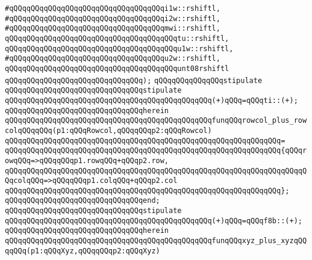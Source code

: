 \verb|#qQQqqQQqqQQqqQQqqQQqqQQqqQQqqQQqqQQqi1w::rshiftl,|\newline
\verb|#qQQqqQQqqQQqqQQqqQQqqQQqqQQqqQQqqQQqi2w::rshiftl,|\newline
\verb|#qQQqqQQqqQQqqQQqqQQqqQQqqQQqqQQqqQQqmwi::rshiftl,|\newline
\verb|qQQqqQQqqQQqqQQqqQQqqQQqqQQqqQQqqQQqqQQqtu::rshiftl,|\newline
\verb|qQQqqQQqqQQqqQQqqQQqqQQqqQQqqQQqqQQqqQQqu1w::rshiftl,|\newline
\verb|#qQQqqQQqqQQqqQQqqQQqqQQqqQQqqQQqqQQqu2w::rshiftl,|\newline
\verb|qQQqqQQqqQQqqQQqqQQqqQQqqQQqqQQqqQQqqQQqunt08rshiftl|\newline
\verb|qQQqqQQqqQQqqQQqqQQqqQQqqQQqqQQq);|\newline
\newline
\verb|qQQqqQQqqQQqqQQqstipulate|\newline
\verb|qQQqqQQqqQQqqQQqqQQqqQQqqQQqqQQqstipulate|\newline
\verb|qQQqqQQqqQQqqQQqqQQqqQQqqQQqqQQqqQQqqQQqqQQqqQQq(+)qQQq=qQQqti::(+);|\newline
\verb|qQQqqQQqqQQqqQQqqQQqqQQqqQQqqQQqherein|\newline
\verb|qQQqqQQqqQQqqQQqqQQqqQQqqQQqqQQqqQQqqQQqqQQqqQQqfunqQQqrowcol_plus_rowcolqQQqqQQq(p1:qQQqRowcol,qQQqqQQqp2:qQQqRowcol)|\newline
\verb|qQQqqQQqqQQqqQQqqQQqqQQqqQQqqQQqqQQqqQQqqQQqqQQqqQQqqQQqqQQqqQQq=|\newline
\verb|qQQqqQQqqQQqqQQqqQQqqQQqqQQqqQQqqQQqqQQqqQQqqQQqqQQqqQQqqQQqqQQq{qQQqrowqQQq=>qQQqqQQqp1.rowqQQq+qQQqp2.row,|\newline
\verb|qQQqqQQqqQQqqQQqqQQqqQQqqQQqqQQqqQQqqQQqqQQqqQQqqQQqqQQqqQQqqQQqqQQqqQQqcolqQQq=>qQQqqQQqp1.colqQQq+qQQqp2.col|\newline
\verb|qQQqqQQqqQQqqQQqqQQqqQQqqQQqqQQqqQQqqQQqqQQqqQQqqQQqqQQqqQQqqQQq};|\newline
\verb|qQQqqQQqqQQqqQQqqQQqqQQqqQQqqQQqend;|\newline
\newline
\verb|qQQqqQQqqQQqqQQqqQQqqQQqqQQqqQQqstipulate|\newline
\verb|qQQqqQQqqQQqqQQqqQQqqQQqqQQqqQQqqQQqqQQqqQQqqQQq(+)qQQq=qQQqf8b::(+);|\newline
\verb|qQQqqQQqqQQqqQQqqQQqqQQqqQQqqQQqherein|\newline
\verb|qQQqqQQqqQQqqQQqqQQqqQQqqQQqqQQqqQQqqQQqqQQqqQQqfunqQQqxyz_plus_xyzqQQqqQQq(p1:qQQqXyz,qQQqqQQqp2:qQQqXyz)|\newline
